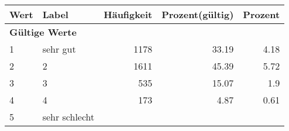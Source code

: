      \begin{longtable}{lXrrr}
     \toprule
     \textbf{Wert} & \textbf{Label} & \textbf{Häufigkeit} & \textbf{Prozent(gültig)} & \textbf{Prozent} \\
     \endhead
     \midrule
     \multicolumn{5}{l}{\textbf{Gültige Werte}}\\

     1 &
     \multicolumn{1}{X}{ sehr gut   } &


       \num{1178} &
       \num[round-mode=places,round-precision=2]{33,19} &
         \num[round-mode=places,round-precision=2]{4,18} \\

     2 &
     \multicolumn{1}{X}{ 2   } &


       \num{1611} &
       \num[round-mode=places,round-precision=2]{45,39} &
         \num[round-mode=places,round-precision=2]{5,72} \\

     3 &
     \multicolumn{1}{X}{ 3   } &


       \num{535} &
       \num[round-mode=places,round-precision=2]{15,07} &
         \num[round-mode=places,round-precision=2]{1,9} \\

     4 &
     \multicolumn{1}{X}{ 4   } &


       \num{173} &
       \num[round-mode=places,round-precision=2]{4,87} &
         \num[round-mode=places,round-precision=2]{0,61} \\

     5 &
     \multicolumn{1}{X}{ sehr schlecht   } &



\end{longtable}

